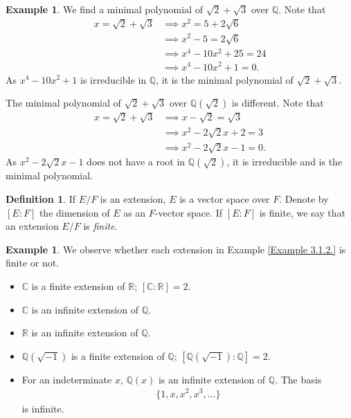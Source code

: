 \documentclass[12pt]{report}
\theoremstyle{plain}
\theoremstyle{remark}
\theoremstyle{definition}
\newtheorem{definition}[theorem]{Definition}
\newtheorem{example}[theorem]{Example}
\newcommand{\Q}{\mathbb{Q}}
\newcommand{\R}{\mathbb{R}}
\newcommand{\C}{\mathbb{C}}
\begin{document}
\begin{example}
    We find a minimal polynomial of $\sqrt{2}+\sqrt{3}$ over $\Q$. Note that
    \begin{align*}
        x=\sqrt{2}+\sqrt{3} &\implies x^2 = 5+2\sqrt{6} \\
        &\implies x^2-5 = 2\sqrt{6} \\
        &\implies x^4-10x^2+25=24 \\
        &\implies x^4-10x^2+1=0.
    \end{align*}
    As $x^4-10x^2+1$ is irreducible in $\Q$, it is the minimal polynomial of $\sqrt{2}+\sqrt{3}$.

    The minimal polynomial of $\sqrt{2}+\sqrt{3}$ over $\Q(\sqrt{2})$ is different. Note that
    \begin{align*}
        x=\sqrt{2}+\sqrt{3} &\implies x-\sqrt{2}=\sqrt{3} \\
        &\implies x^2-2\sqrt{2}x+2 = 3 \\
        &\implies x^2-2\sqrt{2}x-1=0.
    \end{align*}
    As $x^2-2\sqrt{2}x-1$ does not have a root in $\Q(\sqrt{2})$, it is irreducible and is the minimal polynomial.
\end{example}

\begin{definition}
    If $E/F$ is an extension, $E$ is a vector space over $F$. Denote by $[E:F]$ the dimension of $E$ as an $F$-vector space. If $[E:F]$ is finite, we say that an extension $E/F$ is \emph{finite}.
\end{definition}

\begin{example}
    We observe whether each extension in Example \ref{Example 3.1.2.} is finite or not.
    \begin{itemize}
        \item $\C$ is a finite extension of $\R$; $[\C:\R]=2$.
        \item $\C$ is an infinite extension of $\Q$.
        \item $\R$ is an infinite extension of $\Q$.
        \item $\Q(\sqrt{-1})$ is a finite extension of $\Q$; $[\Q(\sqrt{-1}):\Q]=2$.
        \item For an indeterminate $x$, $\Q(x)$ is an infinite extension of $\Q$. The basis
        \begin{align*}
            \{1,x,x^2,x^3,\dots\}
        \end{align*}
        is infinite.
    \end{itemize}
\end{example}
\end{document}

